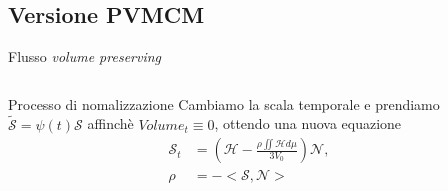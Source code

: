 \subsection*{Versione PVMCM}
\begin{frame}{Flusso \emph{volume preserving}}
  \begin{columns}[c]
    \begin{column}{6cm}
      \begin{block}{Processo di nomalizzazione}
        Cambiamo la scala temporale e prendiamo
        $\mathcal{\tilde{S}}=\psi(t)\mathcal{S}$  affinchè
        \alert{$Volume_t\equiv 0$}, ottendo una nuova equazione 
        \[
        \begin{aligned}
          \mathcal{S}_t&=\left(\mathcal{H}-\frac{\rho\iint\mathcal{H}d\mu}{3V_0}\right)\mathcal{N},\\
          \rho &=-<\mathcal{S},\mathcal{N}>
        \end{aligned}
        \]
       \end{block}
   \end{column}
    \begin{column}[c]{4cm}
       \begin{center}
     \end{center}
    \end{column}
    \end{columns}
\end{frame}
